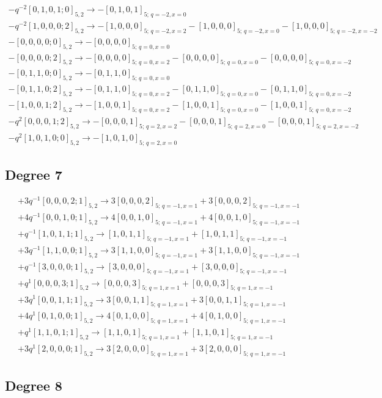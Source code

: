\documentclass{article}
\begin{document}
\[\begin{gathered} -q^{-2}[0,1,0,1;0]_{5,2}\longrightarrow -[0,1,0,1]_{5;\,q=-2,x=0}\\-q^{-2}[1,0,0,0;2]_{5,2}\longrightarrow -[1,0,0,0]_{5;\,q=-2,x=2} -[1,0,0,0]_{5;\,q=-2,x=0} -[1,0,0,0]_{5;\,q=-2,x=-2}\\-[0,0,0,0;0]_{5,2}\longrightarrow -[0,0,0,0]_{5;\,q=0,x=0}\\-[0,0,0,0;2]_{5,2}\longrightarrow -[0,0,0,0]_{5;\,q=0,x=2} -[0,0,0,0]_{5;\,q=0,x=0} -[0,0,0,0]_{5;\,q=0,x=-2}\\-[0,1,1,0;0]_{5,2}\longrightarrow -[0,1,1,0]_{5;\,q=0,x=0}\\-[0,1,1,0;2]_{5,2}\longrightarrow -[0,1,1,0]_{5;\,q=0,x=2} -[0,1,1,0]_{5;\,q=0,x=0} -[0,1,1,0]_{5;\,q=0,x=-2}\\-[1,0,0,1;2]_{5,2}\longrightarrow -[1,0,0,1]_{5;\,q=0,x=2} -[1,0,0,1]_{5;\,q=0,x=0} -[1,0,0,1]_{5;\,q=0,x=-2}\\-q^{2}[0,0,0,1;2]_{5,2}\longrightarrow -[0,0,0,1]_{5;\,q=2,x=2} -[0,0,0,1]_{5;\,q=2,x=0} -[0,0,0,1]_{5;\,q=2,x=-2}\\-q^{2}[1,0,1,0;0]_{5,2}\longrightarrow -[1,0,1,0]_{5;\,q=2,x=0}\end{gathered}\]\subsection*{Degree 7}
\[\begin{gathered} +3q^{-1}[0,0,0,2;1]_{5,2}\longrightarrow 3[0,0,0,2]_{5;\,q=-1,x=1} +3[0,0,0,2]_{5;\,q=-1,x=-1}\\+4q^{-1}[0,0,1,0;1]_{5,2}\longrightarrow 4[0,0,1,0]_{5;\,q=-1,x=1} +4[0,0,1,0]_{5;\,q=-1,x=-1}\\+q^{-1}[1,0,1,1;1]_{5,2}\longrightarrow [1,0,1,1]_{5;\,q=-1,x=1} +[1,0,1,1]_{5;\,q=-1,x=-1}\\+3q^{-1}[1,1,0,0;1]_{5,2}\longrightarrow 3[1,1,0,0]_{5;\,q=-1,x=1} +3[1,1,0,0]_{5;\,q=-1,x=-1}\\+q^{-1}[3,0,0,0;1]_{5,2}\longrightarrow [3,0,0,0]_{5;\,q=-1,x=1} +[3,0,0,0]_{5;\,q=-1,x=-1}\\+q^{1}[0,0,0,3;1]_{5,2}\longrightarrow [0,0,0,3]_{5;\,q=1,x=1} +[0,0,0,3]_{5;\,q=1,x=-1}\\+3q^{1}[0,0,1,1;1]_{5,2}\longrightarrow 3[0,0,1,1]_{5;\,q=1,x=1} +3[0,0,1,1]_{5;\,q=1,x=-1}\\+4q^{1}[0,1,0,0;1]_{5,2}\longrightarrow 4[0,1,0,0]_{5;\,q=1,x=1} +4[0,1,0,0]_{5;\,q=1,x=-1}\\+q^{1}[1,1,0,1;1]_{5,2}\longrightarrow [1,1,0,1]_{5;\,q=1,x=1} +[1,1,0,1]_{5;\,q=1,x=-1}\\+3q^{1}[2,0,0,0;1]_{5,2}\longrightarrow 3[2,0,0,0]_{5;\,q=1,x=1} +3[2,0,0,0]_{5;\,q=1,x=-1}\end{gathered}\]\subsection*{Degree 8}
\end{document}
